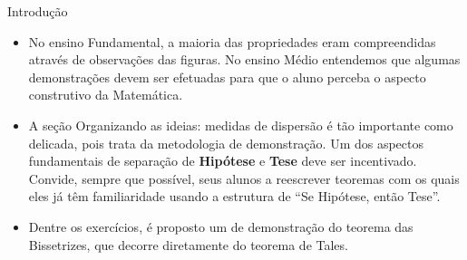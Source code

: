 \begin{apresentacao}{Introdução}
\begin{itemize}
\item {} 
No ensino Fundamental, a maioria das propriedades eram compreendidas através de observações das figuras. No ensino Médio entendemos que algumas demonstrações devem ser efetuadas para que o aluno perceba o aspecto construtivo da Matemática.

\item {} 
A seção Organizando as ideias: medidas de dispersão é tão importante como delicada, pois trata da metodologia de demonstração. Um dos aspectos fundamentais de separação de \textbf{Hipótese} e \textbf{Tese} deve ser incentivado. Convide, sempre que possível, seus alunos a reescrever teoremas com os quais eles já têm familiaridade usando a estrutura de “Se Hipótese, então Tese”.

\item {} 
Dentre os exercícios, é proposto um de demonstração do teorema das Bissetrizes, que decorre diretamente do teorema de Tales.

\end{itemize}

\end{apresentacao}

\cleardoublepage
\def\currentcolor{session1}


